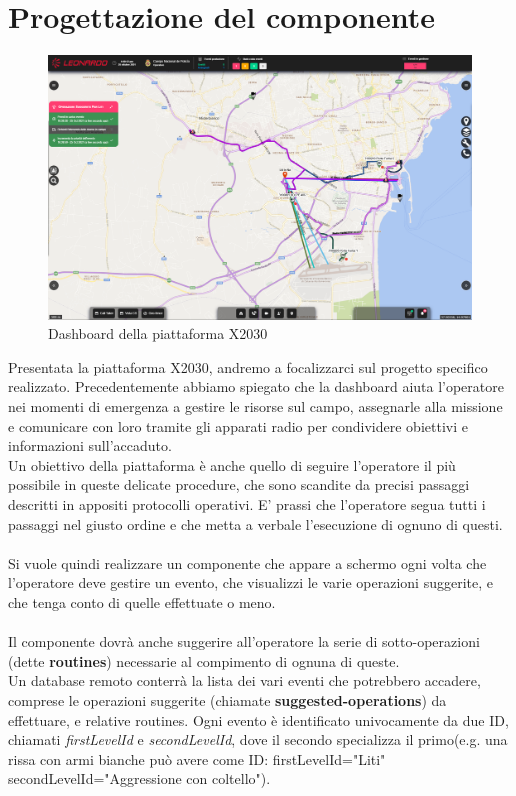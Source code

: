 \section{Progettazione del componente}
\begin{figure}[H]
    \centering
    \includegraphics[width=140mm]{img/screenshotGUI}
    \caption{Dashboard della piattaforma X2030}
  \end{figure}
Presentata la piattaforma X2030, andremo a focalizzarci sul progetto specifico realizzato.
Precedentemente abbiamo spiegato che la dashboard aiuta l'operatore nei momenti di emergenza a gestire le 
risorse sul campo, assegnarle alla missione e comunicare con loro tramite gli apparati radio per 
condividere obiettivi e informazioni sull'accaduto.\\
Un obiettivo della piattaforma è anche quello di seguire l'operatore il più possibile in 
queste delicate procedure,
che sono scandite da precisi passaggi descritti in appositi protocolli operativi.
E' prassi che l'operatore segua tutti i passaggi nel giusto ordine
e che metta a verbale l'esecuzione di ognuno di questi.
\\\\
Si vuole quindi realizzare un componente che appare a schermo ogni volta che l'operatore deve
 gestire un evento,
che visualizzi le varie operazioni suggerite, e che tenga conto di quelle effettuate o meno.
\\\\
Il componente dovrà anche suggerire all'operatore la serie di sotto-operazioni (dette \textbf{routines}) 
necessarie al compimento di ognuna di queste.
\\
Un database remoto conterrà la lista dei vari eventi che potrebbero accadere, comprese le operazioni 
suggerite (chiamate \textbf{suggested-operations}) da effettuare, e relative routines.
Ogni evento è identificato univocamente da due ID, chiamati \emph{firstLevelId} e \emph{secondLevelId}, 
dove il secondo specializza il primo(e.g. una rissa con armi bianche può avere come ID: firstLevelId="Liti" 
secondLevelId="Aggressione con coltello").



